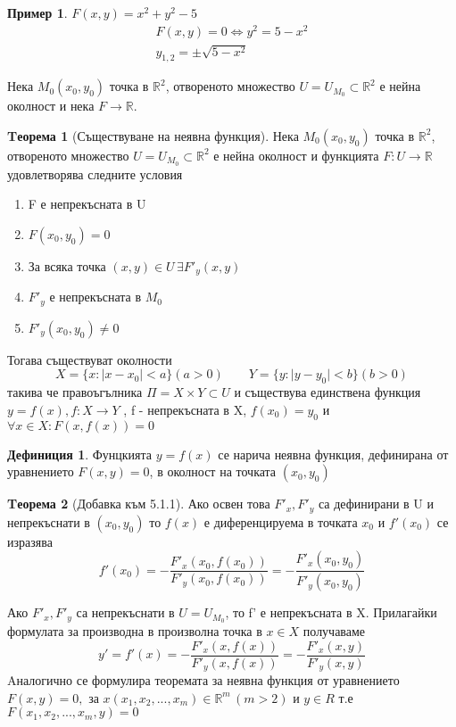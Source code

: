 \documentclass[a4paper,fleqn,12pt]{article}
\theoremstyle{definition}
\newtheorem{theorem}{Tеорема}[subsection]
\newtheorem{definition}{Дефиниция}[subsection]
\newtheorem{example}{Пример}[subsection]
\begin{document}
\begin{example}
$F(x,y) = x^2 +y^2 - 5$
\begin{gather*}
F(x,y) = 0 \iff  y^2 = 5-x^2 \\
y_{1,2} = \pm \sqrt{5-x^2}
\end{gather*}
\end{example}
Нека $M_0 (x_0, y_0) \text{ точка в } \mathbb{R}^2$, отвореното множество $U = U_{M_0} \subset \mathbb{R}^2$ е нейна околност и нека $F \to \mathbb{R}$. 

\begin{theorem}[Съществуване на неявна функция]
Нека $M_0 (x_0, y_0) \text{ точка в } \mathbb{R}^2$, отвореното множество $U = U_{M_0} \subset \mathbb{R}^2$ е нейна околност и функцията $F: U \to \mathbb{R}$ удовлетворява следните условия
\begin{enumerate}

\item F е непрекъсната в U

\item $F(x_0, y_0) = 0$

\item За всяка точка $(x, y) \in U \, \exists F'_y(x,y)$

\item $F'_y \text{ е непрекъсната в } M_0$

\item $F'_y (x_0, y_0) \neq 0$
\end{enumerate}
Тогава съществуват околности
$$X = \{x: \vert x - x_0 \vert < a\} (a>0) \qquad Y = \{y: \vert y - y_0 \vert < b\} (b>0)$$
такива че правоъгълника $\Pi = X \times Y \subset U$ и съществува единствена функция $y = f(x), f: X \to Y$ , f - непрекъсната в X, $f(x_0) = y_0$ и $\forall x \in X: F(x,f(x)) = 0 $ 
\end{theorem}

\begin{definition}
Фунцкията $y = f(x)$ се нарича неявна функция, дефинирана от уравнението $F(x,y) = 0$, в околност на точката $(x_0, y_0)$
\end{definition}


\begin{theorem}[Добавка към 5.1.1]
Ако освен това $F'_x, F'_y$ са дефинирани в U и непрекъснати в $(x_0, y_0)$ то $f(x)$ е диференцируема в точката $x_0$ и $f'(x_0)$ се изразява
$$f'(x_0) = - \dfrac{F'_x(x_0,f(x_0))}{F'_y(x_0,f(x_0))} = - \dfrac{F'_x(x_0,y_0)}{F'_y(x_0,y_0)} $$
\end{theorem}
Ако $F'_x, F'_y$ са непрекъснати в $U = U_{M_0}$, то f' е непрекъсната в X. Прилагайки формулата за производна в произволна точка в $x \in X$ получаваме
\begin{equation}
y' = f'(x) = - \dfrac{F'_x(x,f(x))}{F'_y(x,f(x))} = - \dfrac{F'_x(x,y)}{F'_y(x,y)}
\end{equation}
Aналогично се формулира теоремата за неявна функция от уравнението $F(x,y) = 0, \text{ за } x(x_1, x_2, ..., x_m) \in \mathbb{R}^m \, (m >2)$ и $y \in R$ т.е $F(x_1, x_2, ..., x_m, y) = 0$\\
\end{document}
